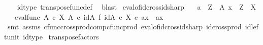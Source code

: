 \begin{isabellebody}
%
\isadelimproof
\ \ %
\endisadelimproof
%
\isatagproof
{}\isamarkupfalse%
\ id{\isacharunderscore}{\kern0pt}type\ transpose{\isacharunderscore}{\kern0pt}func{\isacharunderscore}{\kern0pt}def\ \isamarkupfalse%
\ blast%
\endisatagproof
{\isafoldproof}%
%
\isadelimproof
\isanewline
%
\endisadelimproof
{}\isamarkupfalse%
\ eval{\isacharunderscore}{\kern0pt}of{\isacharunderscore}{\kern0pt}id{\isacharunderscore}{\kern0pt}cross{\isacharunderscore}{\kern0pt}id{\isacharunderscore}{\kern0pt}sharp{}{\isacharcolon}{\kern0pt}\isanewline
\ \ \ {\isachardoublequoteopen}a\ {\isacharcolon}{\kern0pt}\ Z\ {\isasymrightarrow}\ A{\isachardoublequoteclose}\ {\isachardoublequoteopen}x\ {\isacharcolon}{\kern0pt}\ Z\ {\isasymrightarrow}\ X{\isachardoublequoteclose}\isanewline
\ \ \ {\isachardoublequoteopen}{\isacharparenleft}{\kern0pt}{\isacharparenleft}{\kern0pt}eval{\isacharunderscore}{\kern0pt}func\ {\isacharparenleft}{\kern0pt}A\ {\isasymtimes}\isactrlsub c\ X{\isacharparenright}{\kern0pt}\ A{\isacharparenright}{\kern0pt}\ {\isasymcirc}\isactrlsub c\ {\isacharparenleft}{\kern0pt}id{\isacharparenleft}{\kern0pt}A{\isacharparenright}{\kern0pt}\ {\isasymtimes}\isactrlsub f\ {\isacharparenleft}{\kern0pt}id{\isacharparenleft}{\kern0pt}A\ {\isasymtimes}\isactrlsub c\ X{\isacharparenright}{\kern0pt}{\isacharparenright}{\kern0pt}\isactrlsup {\isasymsharp}{\isacharparenright}{\kern0pt}{\isacharparenright}{\kern0pt}\ {\isasymcirc}\isactrlsub c\ {\isasymlangle}a{\isacharcomma}{\kern0pt}x{\isasymrangle}\ {\isacharequal}{\kern0pt}\ {\isasymlangle}a{\isacharcomma}{\kern0pt}x{\isasymrangle}{\isachardoublequoteclose}\isanewline
%
\isadelimproof
\ \ %
\endisadelimproof
%
\isatagproof
{}\isamarkupfalse%
\ {\isacharparenleft}{\kern0pt}smt\ assms\ cfunc{\isacharunderscore}{\kern0pt}cross{\isacharunderscore}{\kern0pt}prod{\isacharunderscore}{\kern0pt}comp{\isacharunderscore}{\kern0pt}cfunc{\isacharunderscore}{\kern0pt}prod\ eval{\isacharunderscore}{\kern0pt}of{\isacharunderscore}{\kern0pt}id{\isacharunderscore}{\kern0pt}cross{\isacharunderscore}{\kern0pt}id{\isacharunderscore}{\kern0pt}sharp{}\ id{\isacharunderscore}{\kern0pt}cross{\isacharunderscore}{\kern0pt}prod\ id{\isacharunderscore}{\kern0pt}left{\isacharunderscore}{\kern0pt}unit{}\ id{\isacharunderscore}{\kern0pt}type{\isacharparenright}{\kern0pt}%
\endisatagproof
{\isafoldproof}%
%
\isadelimproof
\isanewline
%
\endisadelimproof
\isanewline
{}\isamarkupfalse%
\ transpose{\isacharunderscore}{\kern0pt}factors{\isacharcolon}{\kern0pt}\ \isanewline

\end{isabellebody}
